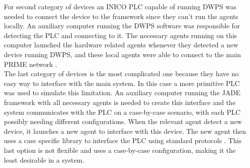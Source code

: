 For second category of devices an INICO \acrshort{PLC} capable of running \acrshort{DWPS} was needed to connect the device to the framework since they can't run the agents locally. An auxiliary computer running the \acrshort{DWPS} software was responsible for detecting the \acrshort{PLC} and connecting to it. The necessary agents running on this computer launched the hardware related agents whenever they detected a new device running \acrshort{DWPS}, and these local agents were able to connect to the main PRIME network \cite{PRIME_plug_and_produce}.\\

The last category of devices is the most complicated one because they have no easy way to interface with the main system. In this case a more primitive \acrshort{PLC} was used to simulate this limitation. An auxiliary computer running the \acrshort{JADE} framework with all necessary agents is needed to create this interface and the system communicates with the \acrshort{PLC} on a case-by-case scenario, with each \acrshort{PLC} possibly needing different configurations. When the relevant agent detect a new device, it launches a new agent to interface with this device. The new agent then uses a case specific library to interface the \acrshort{PLC} using standard protocols \cite{PRIME_plug_and_produce}. This last option is not flexible and uses a case-by-case configuration, making it the least desirable in a system.

